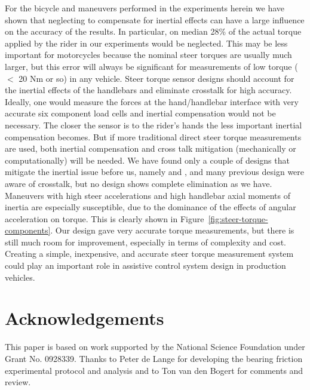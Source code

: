 \documentclass[a4paper]{article}
\begin{document}
For the bicycle and maneuvers performed in the experiments herein we have shown
that neglecting to compensate for inertial effects can have a large influence
on the accuracy of the results. In particular, on median 28\% of the actual
torque applied by the rider in our experiments would be neglected. This may be
less important for motorcycles because the nominal steer torques are usually
much larger, but this error will always be significant for measurements of low
torque ($<$ 20 Nm or so) in any vehicle. Steer torque sensor designs should
account for the inertial effects of the handlebars and eliminate crosstalk for
high accuracy. Ideally, one would measure the forces at the hand/handlebar
interface with very accurate six component load cells and inertial compensation
would not be necessary. The closer the sensor is to the rider's hands the less
important inertial compensation becomes. But if more traditional direct steer
torque measurements are used, both inertial compensation and cross talk
mitigation (mechanically or computationally) will be needed. We have found only
a couple of designs that mitigate the inertial issue before us, namely
\cite{Evertse2010} and \cite{Iuchi2006}, and many previous design were aware of
crosstalk, but no design shows complete elimination as we have. Maneuvers with
high steer accelerations and high handlebar axial moments of inertia are
especially susceptible, due to the dominance of the effects of angular
acceleration on torque. This is clearly shown in
Figure~\ref{fig:steer-torque-components}. Our design gave very accurate torque
measurements, but there is still much room for improvement, especially in terms
of complexity and cost. Creating a simple, inexpensive, and accurate steer
torque measurement system could play an important role in assistive control
system design in production vehicles.

\section*{Acknowledgements}

This paper is based on work supported by the National Science Foundation under
Grant No. 0928339. Thanks to Peter de Lange for developing the bearing friction
experimental protocol and analysis and to Ton van den Bogert for comments and
review.



\end{document}
